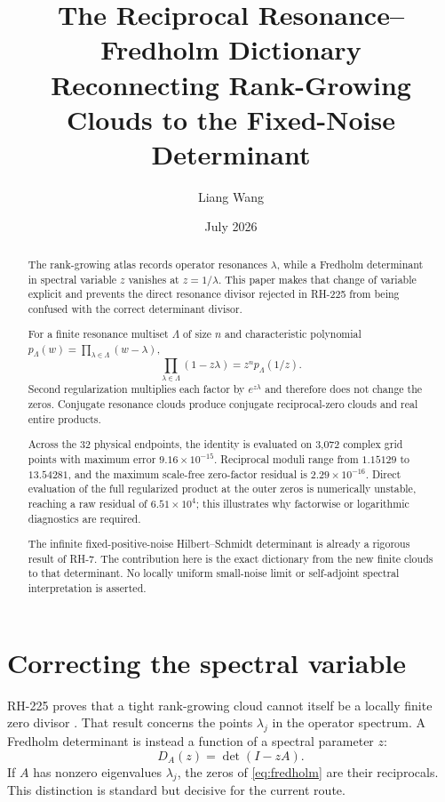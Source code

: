 \documentclass[11pt]{article}
\title{The Reciprocal Resonance--Fredholm Dictionary\\
\large Reconnecting Rank-Growing Clouds to the Fixed-Noise Determinant}
\author{Liang Wang}
\date{July 2026}
\theoremstyle{remark}\newtheorem{remark}[theorem]{Remark}
\newcommand{\Det}{\operatorname{det}}
\begin{document}
\maketitle

\begin{abstract}
The rank-growing atlas records operator resonances $\lambda$, while a
Fredholm determinant in spectral variable $z$ vanishes at $z=1/\lambda$.
This paper makes that change of variable explicit and prevents the direct
resonance divisor rejected in RH-225 from being confused with the correct
determinant divisor.

For a finite resonance multiset $\Lambda$ of size $n$ and characteristic
polynomial $p_\Lambda(w)=\prod_{\lambda\in\Lambda}(w-\lambda)$,
\[
 \prod_{\lambda\in\Lambda}(1-z\lambda)
 =z^n p_\Lambda(1/z).
\]
Second regularization multiplies each factor by $e^{z\lambda}$ and therefore
does not change the zeros. Conjugate resonance clouds produce conjugate
reciprocal-zero clouds and real entire products.

Across the 32 physical endpoints, the identity is evaluated on 3,072 complex
grid points with maximum error $9.16\times10^{-15}$. Reciprocal moduli range
from $1.15129$ to $13.54281$, and the maximum scale-free zero-factor residual
is $2.29\times10^{-16}$. Direct evaluation of the full regularized product at
the outer zeros is numerically unstable, reaching a raw residual of
$6.51\times10^4$; this illustrates why factorwise or logarithmic diagnostics
are required.

The infinite fixed-positive-noise Hilbert--Schmidt determinant is already a
rigorous result of RH-7. The contribution here is the exact dictionary from
the new finite clouds to that determinant. No locally uniform small-noise
limit or self-adjoint spectral interpretation is asserted.
\end{abstract}

\section{Correcting the spectral variable}

RH-225 proves that a tight rank-growing cloud cannot itself be a locally
finite zero divisor \citep{WangRH225}. That result concerns the points
$\lambda_j$ in the operator spectrum. A Fredholm determinant is instead a
function of a spectral parameter $z$:
\begin{equation}\label{eq:fredholm}
 D_A(z)=\Det(I-zA).
\end{equation}
If $A$ has nonzero eigenvalues $\lambda_j$, the zeros of \eqref{eq:fredholm}
are their reciprocals. This distinction is standard but decisive for the
current route.
\end{document}
